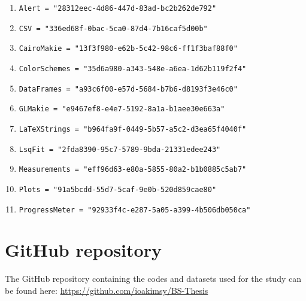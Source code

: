 
\begin{enumerate}
    \item \verb+Alert = "28312eec-4d86-447d-83ad-bc2b262de792"+
    \item \verb+CSV = "336ed68f-0bac-5ca0-87d4-7b16caf5d00b"+
    \item \verb+CairoMakie = "13f3f980-e62b-5c42-98c6-ff1f3baf88f0"+ \cite{MakieJL}
    \item \verb+ColorSchemes = "35d6a980-a343-548e-a6ea-1d62b119f2f4"+
    \item \verb+DataFrames = "a93c6f00-e57d-5684-b7b6-d8193f3e46c0"+ \cite{DataFramesJL}
    \item \verb+GLMakie = "e9467ef8-e4e7-5192-8a1a-b1aee30e663a"+ \cite{MakieJL}
    \item \verb+LaTeXStrings = "b964fa9f-0449-5b57-a5c2-d3ea65f4040f"+
    \item \verb+LsqFit = "2fda8390-95c7-5789-9bda-21331edee243"+
    \item \verb+Measurements = "eff96d63-e80a-5855-80a2-b1b0885c5ab7"+ \cite{Measurements.jl-2016}
    \item \verb+Plots = "91a5bcdd-55d7-5caf-9e0b-520d859cae80"+ \cite{PlotsJL}
    \item \verb+ProgressMeter = "92933f4c-e287-5a05-a399-4b506db050ca"+
\end{enumerate}

\section{GitHub repository}
The GitHub repository containing the codes and datasets used for the study can be found here: \url{https://github.com/ioakimsy/BS-Thesis}

